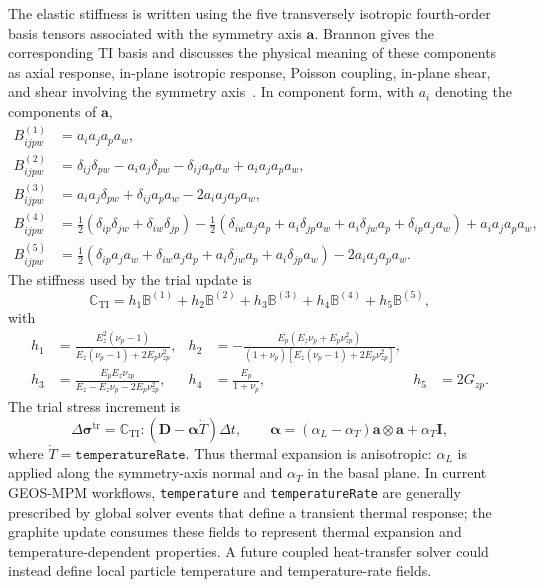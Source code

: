 The elastic stiffness is written using the five transversely isotropic fourth-order basis tensors associated with the symmetry axis \(\mathbf a\).  Brannon gives the corresponding TI basis and discusses the physical meaning of these components as axial response, in-plane isotropic response, Poisson coupling, in-plane shear, and shear involving the symmetry axis~\cite{brannon2017rotation}.  In component form, with \(a_i\) denoting the components of \(\mathbf a\),
\begin{align}
  B^{(1)}_{ijpw} &= a_i a_j a_p a_w,\\
  B^{(2)}_{ijpw} &= \delta_{ij}\delta_{pw}
      -a_i a_j\delta_{pw}-\delta_{ij}a_p a_w+a_i a_j a_p a_w,\\
  B^{(3)}_{ijpw} &= a_i a_j\delta_{pw}+\delta_{ij}a_p a_w
      -2a_i a_j a_p a_w,\\
  B^{(4)}_{ijpw} &= \frac{1}{2}\left(\delta_{ip}\delta_{jw}+\delta_{iw}\delta_{jp}\right)
      -\frac{1}{2}\left(\delta_{iw}a_j a_p+a_i\delta_{jp}a_w+a_i\delta_{jw}a_p+\delta_{ip}a_j a_w\right)
      +a_i a_j a_p a_w,\\
  B^{(5)}_{ijpw} &= \frac{1}{2}\left(\delta_{ip}a_j a_w+\delta_{iw}a_j a_p+a_i\delta_{jw}a_p+a_i\delta_{jp}a_w\right)
      -2a_i a_j a_p a_w.
  \label{eq:graphite-ti-basis}
\end{align}
The stiffness used by the trial update is
\begin{equation}
  \mathbb C_{\mathrm{TI}} = h_1\mathbb B^{(1)}+h_2\mathbb B^{(2)}+h_3\mathbb B^{(3)}+h_4\mathbb B^{(4)}+h_5\mathbb B^{(5)},
  \label{eq:graphite-ti-stiffness}
\end{equation}
with
\begin{align}
  h_1 &= \frac{E_z^2(\nu_p-1)}{E_z(\nu_p-1)+2E_p\nu_{zp}^2},
  &
  h_2 &= -\frac{E_p(E_z\nu_p+E_p\nu_{zp}^2)}{(1+\nu_p)\left[E_z(\nu_p-1)+2E_p\nu_{zp}^2\right]},\\
  h_3 &= \frac{E_pE_z\nu_{zp}}{E_z-E_z\nu_p-2E_p\nu_{zp}^2},
  &
  h_4 &= \frac{E_p}{1+\nu_p},
  &
  h_5 &= 2G_{zp}.
  \label{eq:graphite-h-coefficients}
\end{align}
The trial stress increment is
\begin{equation}
  \Delta\boldsymbol{\sigma}^{\mathrm{tr}}
  = \mathbb C_{\mathrm{TI}}:
  \left(\mathbf D - \boldsymbol{\alpha}\dot T\right)\Delta t,
  \qquad
  \boldsymbol{\alpha} = (\alpha_L-\alpha_T)\mathbf a\otimes\mathbf a+\alpha_T\mathbf I,
  \label{eq:graphite-trial-stress}
\end{equation}
where \(\dot T=\texttt{temperatureRate}\).  Thus thermal expansion is anisotropic: \(\alpha_L\) is applied along the symmetry-axis normal and \(\alpha_T\) in the basal plane.  In current GEOS-MPM workflows, \texttt{temperature} and \texttt{temperatureRate} are generally prescribed by global solver events that define a transient thermal response; the graphite update consumes these fields to represent thermal expansion and temperature-dependent properties.  A future coupled heat-transfer solver could instead define local particle temperature and temperature-rate fields.

